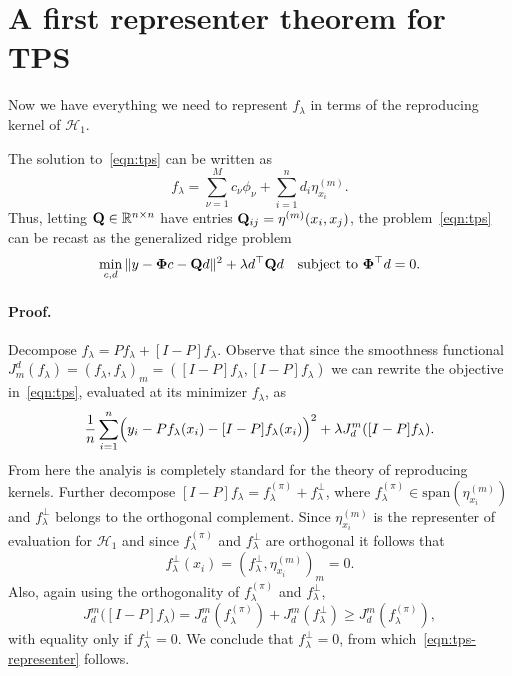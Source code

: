 \documentclass{article}
\newcommand{\mc}[1]{\mathcal{#1}}
\newcommand{\Reals}{\mathbb{R}} %
\newcommand{\1}{\mathbf{1}}
\begin{document}
\section{A first representer theorem for TPS}
Now we have everything we need to represent $f_{\lambda}$ in terms of the reproducing kernel of $\mc{H}_{1}$. 
\begin{proposition}
	\label{prop:tps-representer}
	The solution to~\eqref{eqn:tps} can be written as
	\begin{equation}
	\label{eqn:tps-representer}
	f_{\lambda} = \sum_{\nu = 1}^{M} c_{\nu} \phi_{\nu} + \sum_{i = 1}^{n} d_i \eta^{(m)}_{x_i}.
	\end{equation}
	Thus, letting ${\bf Q} \in \Reals^{n \times n}$ have entries ${\bf Q}_{ij} = \eta^{(m)}(x_i,x_j)$, the problem~\eqref{eqn:tps} can be recast as the generalized ridge problem
	\begin{equation}
	\label{eqn:generalized-ridge}
	\min_{c,d} \|y - {\bf \Phi} c - {\bf Q} d\|^2 + \lambda d^{\top} {\bf Q} d \quad \textrm{subject to ${\bf \Phi}^{\top}d = 0$.}
	\end{equation}
\end{proposition}

\paragraph{Proof.}
Decompose $f_{\lambda} = Pf_{\lambda} + [I - P]f_{\lambda}$. Observe that since the smoothness functional $J_m^d(f_{\lambda}) = (f_{\lambda},f_{\lambda})_m = ([I - P]f_{\lambda}, [I - P]f_{\lambda})$ we can rewrite the objective in~\eqref{eqn:tps}, evaluated at its minimizer $f_{\lambda}$, as
\begin{equation*}
\frac{1}{n}\sum_{i = 1}^{n}\Bigl(y_i - Pf_{\lambda}(x_i) - [I - P]f_{\lambda}(x_i)\Bigr)^2 + \lambda J_d^{m}([I - P]f_{\lambda}).
\end{equation*}
From here the analyis is completely standard for the theory of reproducing kernels. Further decompose $[I - P]f_{\lambda} = f_{\lambda}^{(\pi)} + f_{\lambda}^{\perp}$, where $f_{\lambda}^{(\pi)} \in \mathrm{span}(\eta_{x_i}^{(m)})$ and $f_{\lambda}^{\perp}$ belongs to the orthogonal complement. Since $\eta_{x_i}^{(m)}$ is the representer of evaluation for $\mc{H}_1$ and since $f_{\lambda}^{(\pi)}$ and $f_{\lambda}^{\perp}$ are orthogonal it follows that 
$$f_{\lambda}^{\perp}(x_i) = (f_{\lambda}^{\perp}, \eta_{x_i}^{(m)})_m = 0.$$ 
Also, again using the orthogonality of $f_{\lambda}^{(\pi)}$ and $f_{\lambda}^{\perp}$,
$$J_d^{m}\bigl([I - P]f_{\lambda}\bigr) = J_d^{m}(f_\lambda^{(\pi)}) + J_d^{m}(f_\lambda^{\perp}) \geq J_d^{m}(f_\lambda^{(\pi)}),$$ with equality only if $f_\lambda^{\perp} = 0$. We conclude that $f_{\lambda}^{\perp} = 0$, from which~\eqref{eqn:tps-representer} follows. 
\end{document}
